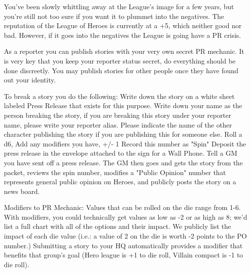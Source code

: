 \documentclass[green]{LRSguildcamp1}
\begin{document}
\name{\gNewspaperPR{}}


You've been slowly whittling away at the League's image for a few years, but you're still not too sure if you want it to plummet into the negatives. The reputation of the League of Heroes is currently at a +5, which neither good nor bad. However, if it goes into the negatives the League is going have a PR crisis.

As a reporter you can publish stories with your very own secret PR mechanic. It is very key that you keep your reporter status secret, do everything should be done discreetly. You may publish stories for other people once they have found out your identity. 

To break a story you do the following:
Write down the story on a white sheet labeled Press Release that exists for this purpose. 
Write down your name as the person breaking the story, if you are breaking this story under your reporter name, please write your reporter alias. Please indicate the name of the other character publishing the story if you are publishing this for someone else. 
Roll a d6, Add any modifiers you have, +/- 1 Record this number as "Spin"
Deposit the press release in the envelope attached to the sign for a Wall Phone. 
Tell a GM you have sent off a press release.
The GM then goes and gets the story from the packet, reviews the spin number, modifies a "Public Opinion" number that represents general public opinion on Heroes, and publicly posts the story on a news board. 

Modifiers to PR Mechanic:
Values that can be rolled on the die range from 1-6. With modifiers, you could technically get values as low as -2 or as high as 8; we'd list a full chart with all of the options and their impact. We publicly list the impact of each die value (i.e.: a value of 2 on the die is worth -2 points to the PO number.)
Submitting a story to your HQ automatically provides a modifier that benefits that group's goal (Hero league is +1 to die roll, Villain compact is -1 to die roll).
\end{document}

